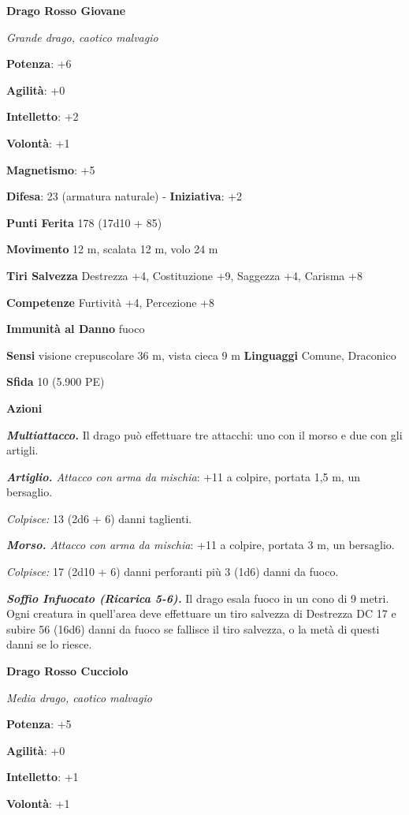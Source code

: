 \begin{multicols}{2}
\textbf{Drago Rosso Giovane}

\emph{Grande drago, caotico malvagio}

\textbf{Potenza}: +6

\textbf{Agilità}: +0

\textbf{Intelletto}: +2

\textbf{Volontà}: +1

\textbf{Magnetismo}: +5

\textbf{Difesa}: 23 (armatura naturale) - \textbf{Iniziativa}: +2

\textbf{Punti Ferita} 178 (17d10 + 85)

\textbf{Movimento} 12 m, scalata 12 m, volo 24 m

\textbf{Tiri Salvezza} Destrezza +4, Costituzione +9, Saggezza +4,
Carisma +8

\textbf{Competenze} Furtività +4, Percezione +8

\textbf{Immunità al Danno} fuoco

\textbf{Sensi} visione crepuscolare 36 m, vista cieca 9 m
\textbf{Linguaggi} Comune, Draconico

\textbf{Sfida} 10 (5.900 PE)

\textbf{Azioni}

\emph{\textbf{Multiattacco.}} Il drago può effettuare tre attacchi: uno
con il morso e due con gli artigli.

\emph{\textbf{Artiglio.} Attacco con arma da mischia}: +11 a colpire,
portata 1,5 m, un bersaglio.

\emph{Colpisce:} 13 (2d6 + 6) danni taglienti.

\emph{\textbf{Morso.} Attacco con arma da mischia}: +11 a colpire,
portata 3 m, un bersaglio.

\emph{Colpisce:} 17 (2d10 + 6) danni perforanti più 3 (1d6) danni da
fuoco.

\emph{\textbf{Soffio Infuocato (Ricarica 5-6).}} Il drago esala fuoco in
un cono di 9 metri. Ogni creatura in quell'area deve effettuare un tiro
salvezza di Destrezza DC 17 e subire 56 (16d6) danni da fuoco se
fallisce il tiro salvezza, o la metà di questi danni se lo riesce.

\textbf{Drago Rosso Cucciolo}

\emph{Media drago, caotico malvagio}

\textbf{Potenza}: +5

\textbf{Agilità}: +0

\textbf{Intelletto}: +1

\textbf{Volontà}: +1


\end{multicols}
